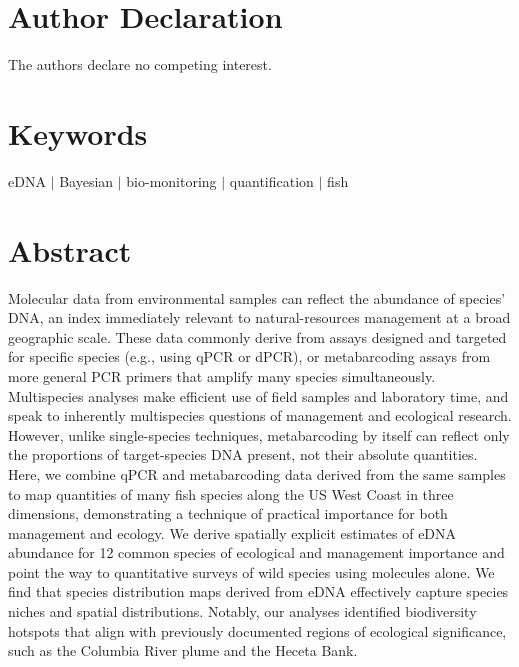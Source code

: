 \documentclass{article}
\begin{document}
\section*{Author Declaration}
The authors declare no competing interest.

\section*{Keywords}
eDNA $|$ Bayesian $|$ bio-monitoring $|$ quantification $|$ fish

\section*{Abstract}
Molecular data from environmental samples can reflect the abundance of species’ DNA, an index immediately relevant to natural-resources management at a broad geographic scale. These data commonly derive from assays designed and targeted for specific species (e.g., using qPCR or dPCR), or metabarcoding assays from more general PCR primers that amplify many species simultaneously. Multispecies analyses make efficient use of field samples and laboratory time, and speak to inherently multispecies questions of management and ecological research. However, unlike single-species techniques, metabarcoding by itself can reflect only the proportions of target-species DNA present, not their absolute quantities. Here, we combine qPCR and metabarcoding data derived from the same samples to map quantities of many fish species along the US West Coast in three dimensions, demonstrating a technique of practical importance for both management and ecology. We derive spatially explicit estimates of eDNA abundance for 12 common species of ecological and management importance and point the way to quantitative surveys of wild species using molecules alone. We find that species distribution maps derived from eDNA effectively capture species niches and spatial distributions. Notably, our analyses identified biodiversity hotspots that align with previously documented regions of ecological significance, such as the Columbia River plume and the Heceta Bank.
\end{document}
